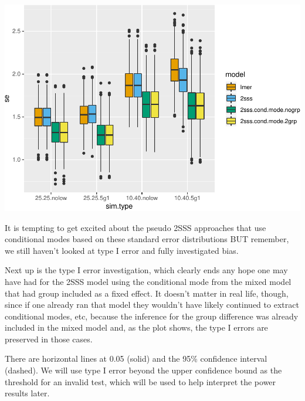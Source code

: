 \documentclass[
]{book}
\begin{document}
\includegraphics{4_video6_group_comparison_three_models_files/figure-latex/unnamed-chunk-5-1.pdf}

It is tempting to get excited about the pseudo 2SSS approaches that use conditional modes based on these standard error distributions BUT remember, we still haven't looked at type I error and fully investigated bias.

Next up is the type I error investigation, which clearly ends any hope one may have had for the 2SSS model using the conditional mode from the mixed model that had group included as a fixed effect. It doesn't matter in real life, though, since if one already ran that model they wouldn't have likely continued to extract conditional modes, etc, because the inference for the group difference was already included in the mixed model and, as the plot shows, the type I errors are preserved in those cases.

There are horizontal lines at 0.05 (solid) and the 95\% confidence interval (dashed). We will use type I error beyond the upper confidence bound as the threshold for an invalid test, which will be used to help interpret the power results later.
\end{document}
